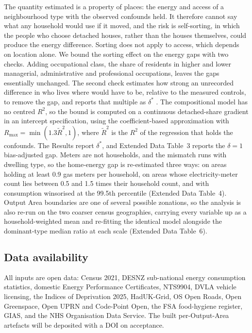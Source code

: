 \documentclass[pdflatex,sn-nature]{sn-jnl}
\begin{document}
The quantity estimated is a property of places: the energy and access of a neighbourhood type with the observed confounds held. It therefore cannot say what any household would use if it moved, and the risk is self-sorting, in which the people who choose detached houses, rather than the houses themselves, could produce the energy difference. Sorting does not apply to access, which depends on location alone. We bound the sorting effect on the energy gaps with two checks. Adding occupational class, the share of residents in higher and lower managerial, administrative and professional occupations, leaves the gaps essentially unchanged. The second check estimates how strong an unrecorded difference in who lives where would have to be, relative to the measured controls, to remove the gap, and reports that multiple as $\delta^{*}$ \citep{oster2019}. The compositional model has no centred $R^2$, so the bound is computed on a continuous detached-share gradient in an intercept specification, using the coefficient-based approximation with $R_{\max} = \min(1.3\tilde{R}^{2}, 1)$, where $\tilde{R}^{2}$ is the $R^{2}$ of the regression that holds the confounds. The Results report $\delta^{*}$, and Extended Data Table~3 reports the $\delta = 1$ bias-adjusted gap. Meters are not households, and the mismatch runs with dwelling type, so the home-energy gap is re-estimated three ways: on areas holding at least 0.9 gas meters per household, on areas whose electricity-meter count lies between 0.5 and 1.5 times their household count, and with consumption winsorised at the 99.5th percentile (Extended Data Table~4). Output Area boundaries are one of several possible zonations, so the analysis is also re-run on the two coarser census geographies, carrying every variable up as a household-weighted mean and re-fitting the identical model alongside the dominant-type median ratio at each scale (Extended Data Table~6).

\subsection*{Data availability}

All inputs are open data: Census 2021, DESNZ sub-national energy consumption statistics, domestic Energy Performance Certificates, NTS9904, DVLA vehicle licensing, the Indices of Deprivation 2025, HadUK-Grid, OS Open Roads, Open Greenspace, Open UPRN and Code-Point Open, the FSA food-hygiene register, GIAS, and the NHS Organisation Data Service. The built per-Output-Area artefacts will be deposited with a DOI on acceptance. %
\end{document}
